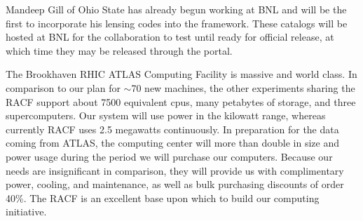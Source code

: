 \documentclass[12pt]{article}
\begin{document}
Mandeep Gill of Ohio State has already begun working at BNL and will be the
first to incorporate his lensing codes into the framework.  These catalogs will
be hosted at BNL for the collaboration to test until ready for official release,
at which time they may be released through the portal.


The Brookhaven RHIC ATLAS Computing Facility is massive and world class.  In
comparison to our plan for $\sim$70 new machines, the other experiments sharing
the RACF support about 7500 equivalent cpus, many petabytes of storage, and
three supercomputers.  Our system will use power in the kilowatt range, whereas
currently RACF uses 2.5 megawatts continuously.  In preparation for the data
coming from ATLAS, the computing center will more than double in size and power
usage during the period we will purchase our computers.  Because our needs are
insignificant in comparison, they will provide us with complimentary power,
cooling, and maintenance, as well as bulk purchasing discounts of order 40\%.
The RACF is an excellent base upon which to build our computing initiative.




\end{document}
